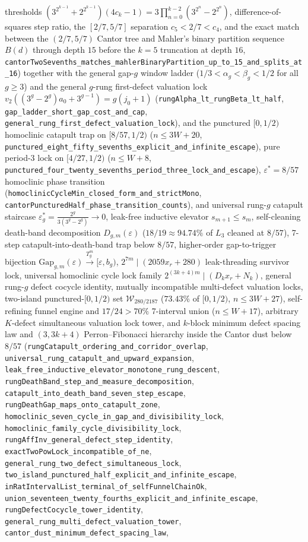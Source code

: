 \documentclass[11pt]{article}
\begin{document}
\begin{enumerate}
thresholds $(3^{2^{k-1}} + 2^{2^{k-1}})(4c_k - 1) = 3\prod_{n=0}^{k-2}(3^{2^n} - 2^{2^n})$, difference-of-squares step ratio, the $[2/7, 5/7]$ separation $c_5 < 2/7 < c_4$, and the exact match between the $(2/7, 5/7)$ Cantor tree and Mahler's binary partition sequence $B(d)$ through depth $15$ before the $k=5$ truncation at depth $16$, \texttt{cantorTwoSevenths\_matches\_mahlerBinaryPartition\_up\_to\_15\_and\_splits\_at\_16}) together with the general gap-$g$ window ladder ($1/3 < \alpha_g < \beta_g < 1/2$ for all $g \ge 3$) and the general $g$-rung first-defect valuation lock $v_2((3^g - 2^g)a_0 + 3^{g-1}) = g(j_0 + 1)$ (\texttt{rungAlpha\_lt\_rungBeta\_lt\_half}, \texttt{gap\_ladder\_short\_gap\_cost\_and\_cap}, \texttt{general\_rung\_first\_defect\_valuation\_lock}), and the punctured $[0, 1/2)$ homoclinic catapult trap on $[8/57, 1/2)$ ($n \le 3W + 20$, \texttt{punctured\_eight\_fifty\_sevenths\_explicit\_and\_infinite\_escape}), pure period-3 lock on $[4/27, 1/2)$ ($n \le W + 8$, \texttt{punctured\_four\_twenty\_sevenths\_period\_three\_lock\_and\_escape}), $\varepsilon^* = 8/57$ homoclinic phase transition (\texttt{homoclinicCycleMin\_closed\_form\_and\_strictMono}, \texttt{cantorPuncturedHalf\_phase\_transition\_counts}), and universal rung-$g$ catapult staircase $\varepsilon_g^* = \frac{2^g}{3(3^g-2^g)} \to 0$, leak-free inductive elevator $s_{m+1} \le s_m$, self-cleaning death-band decomposition $D_{g,m}(\varepsilon)$ ($18/19 \approx 94.74\%$ of $L_3$ cleaned at $8/57$), 7-step catapult-into-death-band trap below $8/57$, higher-order gap-to-trigger bijection $\text{Gap}_{g,m}(\varepsilon) \xrightarrow{T_g^m} [\varepsilon, b_g)$, $2^{7m} \mid (2059 x_r + 280)$ leak-threading survivor lock, universal homoclinic cycle lock family $2^{(3k+4)m} \mid (D_k x_r + N_k)$, general rung-$g$ defect cocycle identity, mutually incompatible multi-defect valuation locks, two-island punctured-$[0, 1/2)$ set $\mathcal{W}_{280/2187}$ ($73.43\%$ of $[0, 1/2)$, $n \le 3W + 27$), self-refining funnel engine and $17/24 > 70\%$ 7-interval union ($n \le W + 17$), arbitrary $K$-defect simultaneous valuation lock tower, and $k$-block minimum defect spacing law and $(3, 3k+4)$ Perron--Fibonacci hierarchy inside the Cantor dust below $8/57$ (\texttt{rungCatapult\_ordering\_and\_corridor\_overlap}, \texttt{universal\_rung\_catapult\_and\_upward\_expansion}, \texttt{leak\_free\_inductive\_elevator\_monotone\_rung\_descent}, \texttt{rungDeathBand\_step\_and\_measure\_decomposition}, \texttt{catapult\_into\_death\_band\_seven\_step\_escape}, \texttt{rungDeathGap\_maps\_onto\_catapult\_zone}, \texttt{homoclinic\_seven\_cycle\_in\_gap\_and\_divisibility\_lock}, \texttt{homoclinic\_family\_cycle\_divisibility\_lock}, \texttt{rungAffInv\_general\_defect\_step\_identity}, \texttt{exactTwoPowLock\_incompatible\_of\_ne}, \texttt{general\_rung\_two\_defect\_simultaneous\_lock}, \texttt{two\_island\_punctured\_half\_explicit\_and\_infinite\_escape}, \texttt{inRatIntervalList\_terminal\_of\_selfFunnelChainOk}, \texttt{union\_seventeen\_twenty\_fourths\_explicit\_and\_infinite\_escape}, \texttt{rungDefectCocycle\_tower\_identity}, \texttt{general\_rung\_multi\_defect\_valuation\_tower}, \texttt{cantor\_dust\_minimum\_defect\_spacing\_law}, 
\end{enumerate}
\end{document}
